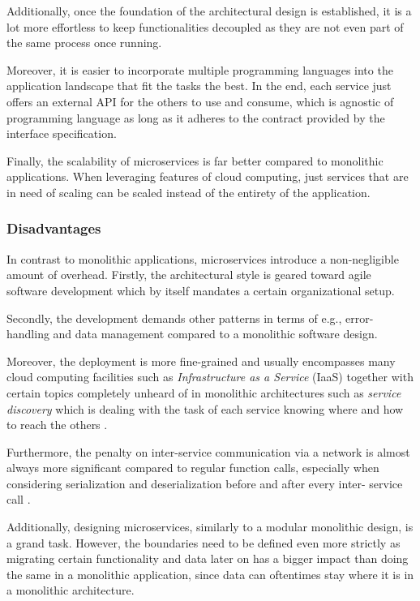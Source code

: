 \documentclass[12pt,a4paper]{report}
\begin{document}
Additionally, once the foundation of the architectural design is established,
it is a lot more effortless to keep functionalities decoupled as they are not
even part of the same process once running.

Moreover, it is easier to incorporate multiple programming languages into the
application landscape that fit the tasks the best. In the end, each service
just offers an external API for the others to use and consume, which is
agnostic of programming language as long as it adheres to the contract provided
by the interface specification.

Finally, the scalability of microservices is far better compared to monolithic
applications. When leveraging features of cloud computing, just services that
are in need of scaling can be scaled instead of the entirety of the
application.


\subsubsection{Disadvantages}
In contrast to monolithic applications,
microservices introduce a non\hyp negligible amount of overhead. Firstly, the
architectural style is geared toward agile software development which by itself
mandates a certain organizational setup.

Secondly, the development demands other patterns in terms of e.g., error\hyp
handling and data management compared to a monolithic software design.

Moreover, the deployment is more fine-grained and usually encompasses many
cloud computing facilities such as \textit{Infrastructure as a Service} (IaaS)
together with certain topics completely unheard of in monolithic architectures
such as \textit{service discovery} which is dealing with the task of each
service knowing where and how to reach the others \cite{newman2015building}.

Furthermore, the penalty on inter-service communication via a network is almost
always more significant compared to regular function calls, especially when
considering serialization and deserialization before and after every inter-
service call \cite{knoche2016sustaining, newman2015building}.

Additionally, designing microservices, similarly to a modular monolithic
design, is a grand task. However, the boundaries need to be defined even more
strictly as migrating certain functionality and data later on has a bigger
impact than doing the same in a monolithic application, since data can
oftentimes stay where it is in a monolithic architecture.
\end{document}
